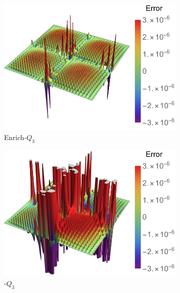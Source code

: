 \begin{figure}[ht]
	\center
	\captionsetup[subfigure]{labelformat=empty}
	\begin{subfigure}[t]{.45\linewidth}
		\center
		\includegraphics[scale=.52]{four_patch_poisson_op_contour}
		\caption{Enrich-$Q_3$}
	\end{subfigure}
	\begin{subfigure}[t]{.45\linewidth}
		\center
		\includegraphics[scale=.52]{four_patch_poisson_Bezier_contour}
		\caption{\Bezier-$Q_3$}
	\end{subfigure}\\
	\center
	\begin{subfigure}[t]{.45\linewidth}
		\center

\end{subfigure}
\end{figure}
